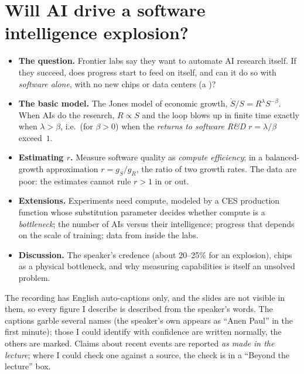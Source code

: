 \chapter{Will AI drive a software intelligence explosion?}\label{ch:L4}

\begin{glance}
\begin{itemize}
  \item \textbf{The question.} Frontier labs say they want to automate AI research itself. If they succeed, does progress start to feed on itself, and can it do so with \emph{software alone}, with no new chips or data centers (a )?
  \item \textbf{The basic model.} The Jones model of economic growth, $\dot S/S=R^{\lambda}S^{-\beta}$. When AIs do the research, $R\propto S$ and the loop blows up in finite time exactly when $\lambda>\beta$, i.e.\ (for $\beta>0$) when the \emph{returns to software R\&D} $r=\lambda/\beta$ exceed~$1$.
  \item \textbf{Estimating $r$.} Measure software quality as \emph{compute efficiency}; in a balanced-growth approximation $r=g_S/g_R$, the ratio of two growth rates. The data are poor: the estimates cannot rule $r>1$ in or out.
  \item \textbf{Extensions.} Experiments need compute, modeled by a CES production function whose substitution parameter decides whether compute is a \emph{bottleneck}; the number of AIs versus their intelligence; progress that depends on the scale of training; data from inside the labs.
  \item \textbf{Discussion.} The speaker's credence (about 20--25\% for an explosion), chips as a physical bottleneck, and why measuring capabilities is itself an unsolved problem.
\end{itemize}
\end{glance}

\begin{caution}
The recording has English auto-captions only, and the slides are not visible in them, so every figure I describe is described from the speaker's words. The captions garble several names (the speaker's own appears as ``Anen Paul'' in the first minute); those I could identify with confidence are written normally, the others are marked\flag. Claims about recent events are reported \emph{as made in the lecture}; where I could check one against a source, the check is in a ``Beyond the lecture'' box.
\end{caution}

